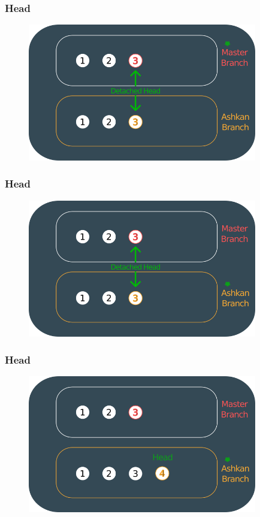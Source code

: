 \documentclass{beamer}
\begin{document}
	\begin{frame}
		\frametitle{Head}
		\begin{figure}[htbp]
			\centering
			\includegraphics[width=10cm]{head7}
		\end{figure}
	\end{frame}
	
	\begin{frame}
		\frametitle{Head}
		\begin{figure}[htbp]
			\centering
			\includegraphics[width=10cm]{head8}
		\end{figure}
	\end{frame}
	
	\begin{frame}
		\frametitle{Head}
		\begin{figure}[htbp]
			\centering
			\includegraphics[width=10cm]{head9}
		\end{figure}
	\end{frame}
	
\end{document}
